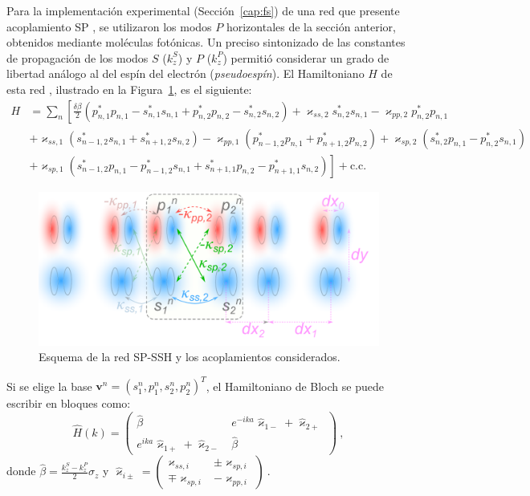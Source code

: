 Para la implementación experimental (Sección~\ref{cap:fs}) de una red que presente acoplamiento SP \citep{interorbital, toporusos, SPSSH}, se utilizaron los modos $P$ horizontales de la sección anterior, obtenidos mediante moléculas fotónicas. Un preciso sintonizado de las constantes de propagación de los modos $S$ ($k_z^S$) y $P$ ($k_z^P$) permitió considerar un grado de libertad análogo al del espín del electrón (\textit{pseudoespín}). El Hamiltoniano $H$ de esta red \citep{SPSSH}, ilustrado en la Figura~\ref{fig:sp-ssh-model}, es el siguiente:
\begin{align*}
	H &= \sum_n \left[\frac{\delta\beta}{2} \left( p^*_{n, 1} p_{n, 1} - s^*_{n, 1} s_{n, 1} + p^*_{n, 2} p_{n, 2} - s^*_{n, 2} s_{n, 2} \right) + \varkappa_{ss, 2}s^*_{n, 2} s_{n, 1} - \varkappa_{pp, 2}p^*_{n, 2} p_{n, 1} \right. \\
	&+ \varkappa_{ss, 1} \left( s_{n-1, 2}^*s_{n, 1} + s_{n+1, 2}^*s_{n, 2} \right) - \varkappa_{pp, 1} \left( p_{n-1, 2}^*p_{n, 1} + p_{n+1, 2}^*p_{n, 2} \right) + \varkappa_{sp, 2} \left( s_{n, 2}^* p_{n, 1} - p_{n, 2}^* s_{n, 1} \right) \\
	&+ \left. \varkappa_{sp, 1} \left( s_{n-1, 2}^* p_{n, 1} - p_{n-1, 2}^* s_{n, 1} + s_{n+1, 1}^*p_{n, 2} - p_{n+1, 1}^* s_{n, 2} \right) \right] + \text{c.c.}
\end{align*}

\begin{figure}[H]
	\centering
	\includegraphics[width=0.8\linewidth]{media/ssh_sp_model}
	\caption{Esquema de la red SP-SSH y los acoplamientos considerados. \label{fig:sp-ssh-model}}
\end{figure}

Si se elige la base $\mathbf{v}^n = \left( s_1^n, p_1^n, s_2^n, p_2^n \right)^T$, el Hamiltoniano de Bloch se puede escribir en bloques como:
\begin{equation*}
	\hat{H}(k) = \begin{pmatrix}
		\hat{\beta} & e^{-ika} \hat{\varkappa}_{1-} + \hat{\varkappa}_{2+} \\
		e^{ika} \hat{\varkappa}_{1+} + \hat{\varkappa}_{2-} & \hat{\beta}
	\end{pmatrix} \ ,
\end{equation*}
donde $\hat{\beta} = \frac{k_z^S - k_z^P}{2} \hat{\sigma}_z$ y $\hat{\varkappa}_{i\pm} = \begin{pmatrix}
	\varkappa_{ss, i} & \pm\varkappa_{sp, i} \\
	\mp\varkappa_{sp, i} & - \varkappa_{pp, i}
\end{pmatrix} \ .$

